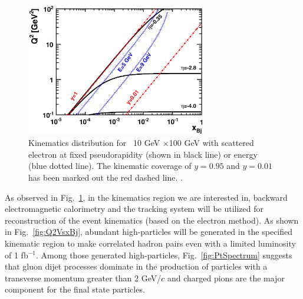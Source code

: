 \begin{figure} 
\begin{center}
\includegraphics[width=0.7\textwidth]
{plots/chpt6/Q2vX_eta_E.eps}
\end{center} 
\caption[Contours of fixed scattered electron kinematics]{Kinematics distribution for \ep\ 10 GeV $\times$100 GeV with 
scattered electron at fixed pseudorapidity (shown in black line) or energy (blue dotted line). The kinematic coverage
of $y=0.95$ and $y=0.01$ has been marked out the red dashed line.  
.}
\label{fig:scattered_electron}
\end{figure}

As observed in Fig.~\ref{fig:scattered_electron}, in the kinematics region we are interested in,
backward electromagnetic calorimetry and the tracking system will be utilized for
reconstruction of the event kinematics (based on the electron method). As shown in
Fig.~\ref{fig:Q2VsxBj}, abundant high-\pt particles will be generated in the
specified kinematic region to make correlated hadron pairs even with a limited
luminosity of 1 fb$^{-1}$. Among those generated high-\pt particles,
Fig.~\ref{fig:PtSpectrum} suggests that gluon dijet processes dominate in the
production of particles with a transverse momentum greater than 2 GeV/$c$ and
charged pions are the major component for the final state particles.


